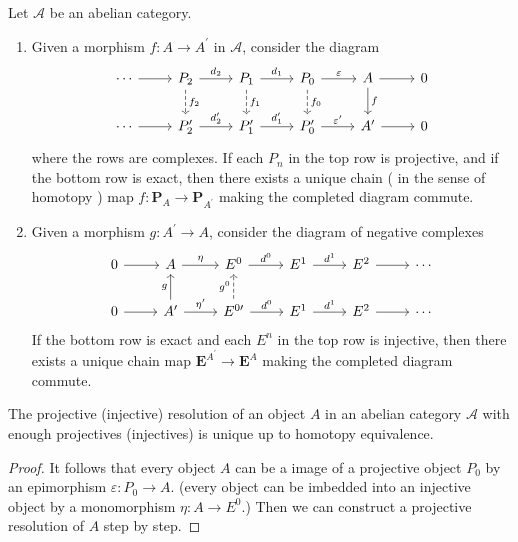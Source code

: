 \documentclass[12pt, oneside]{book}
\begin{document}
\begin{theorem}
    \label{thm: comparison theorem}
    Let $\mathcal{A}$ be an abelian category.
    \begin{enumerate}
        \item
              Given a morphism $f: A \rightarrow A^{\prime}$ in $\mathcal{A}$, consider the diagram
              \begin{equation*}
                  \begin{tikzcd}
                      \cdots \arrow[r] & P_2 \arrow[dashed]{d}{f_2} \arrow[r,"d_2"] & P_1 \arrow[dashed]{d}{f_1} \arrow[r,"d_1"] & P_0 \arrow[dashed]{d}{f_0} \arrow[r,"\varepsilon"] & A \arrow{d}{f} \arrow[r] & 0 \\
                      \cdots \arrow[r] & P_2^{\prime} \arrow[r,"d_2^{\prime}"] & P_1^{\prime} \arrow[r,"d_1^{\prime}"] & P_0^{\prime} \arrow[r,"\varepsilon^{\prime}"] & A^{\prime} \arrow[r] & 0
                  \end{tikzcd}
              \end{equation*}
              where the rows are complexes. If each $P_n$ in the top row is projective, and if the bottom row is exact, then there exists a unique chain ( in the sense of homotopy ) map $f: \mathbf{P}_A \rightarrow \mathbf{P}_{A^{\prime}}$ making the completed diagram commute.
        \item
              Given a morphism $g: A^{\prime} \rightarrow A$, consider the diagram of negative complexes
              \begin{equation*}
                  \begin{tikzcd}
                      0 \arrow[r] & A \arrow[r,"\eta"] & E^{0}  \arrow[r,"d^{0}"] & E^{1}  \arrow[r,"d^{1}"] & E^{2}  \arrow[r] & \cdots \\
                      0 \arrow[r] & A^\prime \arrow[u,"g"]\arrow[r,"\eta^\prime"] & E^{0\prime}\arrow[u,dashed,"g^0"] \arrow[r,"d^0"] & E^1 \arrow[r,"d^1"] & E^2 \arrow[r] & \cdots
                  \end{tikzcd}
              \end{equation*}
              If the bottom row is exact and each $E^n$ in the top row is injective, then there exists a unique chain map $\mathbf{E}^{A^{\prime}} \rightarrow \mathbf{E}^A$ making the completed diagram commute.
    \end{enumerate}
\end{theorem}

\begin{corollary}
    The projective (injective) resolution of an object $A$ in an abelian category $\mathcal{A}$ with enough projectives (injectives) is unique up to homotopy equivalence.
    \begin{proof}
        It follows that every object $A$ can be a image of a projective object $P_0$ by an epimorphism $\varepsilon: P_0 \rightarrow A$. (every object can be imbedded into an injective object by a monomorphism $\eta: A \rightarrow E^0$.)
        Then we can construct a projective resolution of $A$ step by step.
    \end{proof}
\end{corollary}
\end{document}
